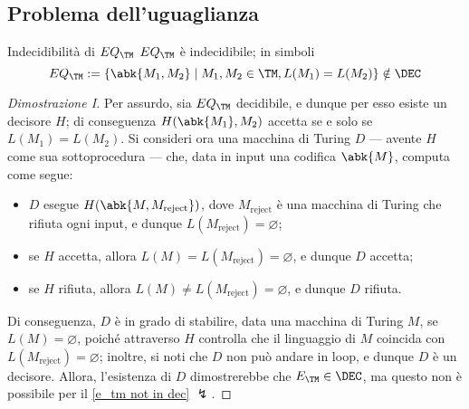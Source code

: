 \documentclass[a4paper, 12pt]{report}
\begin{document}
    \subsection{Problema dell'uguaglianza}

    \begin{framedthm}{Indecidibilità di $EQ_\TM$}
        $EQ_\TM$ è indecidibile; in simboli $$EQ_\TM := \{\abk{M_1, M_2} \mid M_1, M_2 \in \TM, L(M_1) = L(M_2)\} \notin \DEC$$
    \end{framedthm}

    \begin{proof}[Dimostrazione I]
        Per assurdo, sia $EQ_\TM$ decidibile, e dunque per esso esiste un decisore $H$; di conseguenza $H(\abk{M_1}, {M_2})$ accetta se e solo se $L(M_1)= L(M_2)$. Si consideri ora una macchina di Turing $D$ --- avente $H$ come sua sottoprocedura --- che, data in input una codifica $\abk{M}$, computa come segue:

        \begin{itemize}
            \item $D$ esegue $H(\abk{M, M_\mathrm{reject}})$, dove $M_\mathrm{reject }$ è una macchina di Turing che rifiuta ogni input, e dunque $L(M_\mathrm{reject}) = \varnothing$;
            \item se $H$ accetta, allora $L(M) = L(M_\mathrm{reject}) = \varnothing$, e dunque $D$ accetta;
            \item se $H$ rifiuta, allora $L(M) \neq L(M_\mathrm{reject}) = \varnothing$, e dunque $D$ rifiuta.
        \end{itemize}

        Di conseguenza, $D$ è in grado di stabilire, data una macchina di Turing $M$, se $L(M) = \varnothing$, poiché attraverso $H$ controlla che il linguaggio di $M$ coincida con $L(M_\mathrm{reject})= \varnothing$; inoltre, si noti che $D$ non può andare in loop, e dunque $D$ è un decisore. Allora, l'esistenza di $D$ dimostrerebbe che $E_\TM \in \DEC$, ma questo non è possibile per il \cref{e_tm not in dec} $\lightning$.
    \end{proof}
\end{document}
